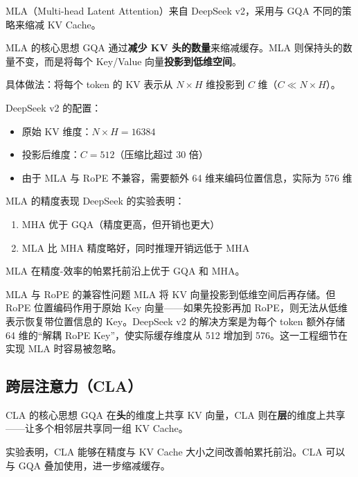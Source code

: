 MLA（Multi-head Latent Attention）来自 DeepSeek v2，采用与 GQA 不同的策略来缩减 KV Cache。

\begin{importantbox}{MLA 的核心思想}
GQA 通过\textbf{减少 KV 头的数量}来缩减缓存。MLA 则保持头的数量不变，而是将每个 Key/Value 向量\textbf{投影到低维空间}。

具体做法：将每个 token 的 KV 表示从 $N \times H$ 维投影到 $C$ 维（$C \ll N \times H$）。
\end{importantbox}

DeepSeek v2 的配置：
\begin{itemize}
    \item 原始 KV 维度：$N \times H = 16384$
    \item 投影后维度：$C = 512$（压缩比超过 30 倍）
    \item 由于 MLA 与 RoPE 不兼容，需要额外 64 维来编码位置信息，实际为 576 维
\end{itemize}

\begin{knowledgebox}{MLA 的精度表现}
DeepSeek 的实验表明：
\begin{enumerate}
    \item MHA 优于 GQA（精度更高，但开销也更大）
    \item MLA 比 MHA 精度略好，同时推理开销远低于 MHA
\end{enumerate}
MLA 在精度-效率的帕累托前沿上优于 GQA 和 MHA。
\end{knowledgebox}

\begin{warningbox}{MLA 与 RoPE 的兼容性问题}
MLA 将 KV 向量投影到低维空间后再存储。但 RoPE 位置编码作用于原始 Key 向量——如果先投影再加 RoPE，则无法从低维表示恢复带位置信息的 Key。DeepSeek v2 的解决方案是为每个 token 额外存储 64 维的``解耦 RoPE Key''，使实际缓存维度从 512 增加到 576。这一工程细节在实现 MLA 时容易被忽略。
\end{warningbox}

\subsection{跨层注意力（CLA）}

\begin{importantbox}{CLA 的核心思想}
GQA 在\textbf{头}的维度上共享 KV 向量，CLA 则在\textbf{层}的维度上共享——让多个相邻层共享同一组 KV Cache。
\end{importantbox}

实验表明，CLA 能够在精度与 KV Cache 大小之间改善帕累托前沿。CLA 可以与 GQA 叠加使用，进一步缩减缓存。

